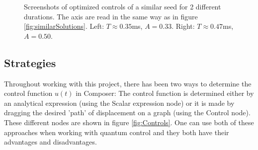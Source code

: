 \documentclass[aps,pra,reprint,superscriptaddress]{revtex4-1}
\begin{document}
\begin{figure}
\begin{subfigure}{0.4\columnwidth}
	\end{subfigure}
	\caption{Screenshots of optimized controls of a similar seed for 2 different durations. The axis are read in the same way as in figure \ref{fig:similarSolutions}. Left: $T\approx 0.35$ms, $A=0.33$. Right: $T\approx 0.47$ms, $A=0.50$.}
	\label{fig:SimilarTimescales}
\end{figure}

\subsection{\label{subsec:strats}Strategies}
Throughout working with this project, there has been two ways to determine the control function $u(t)$ in Composer: The control function is determined either by an analytical expression (using the Scalar expression node) or it is made by dragging the desired 'path' of displacement on a graph (using the Control node). These different nodes are shown in figure \ref{fig:Controls}. One can use both of these approaches when working with quantum control and they both have their advantages and disadvantages. \\
\end{document}
